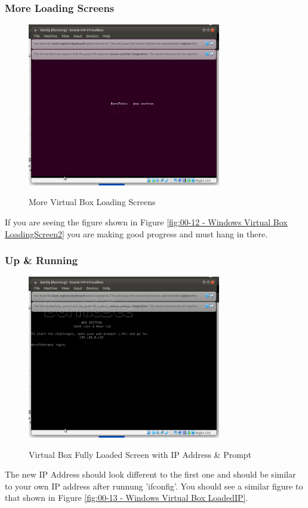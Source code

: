\subsubsection{More Loading Screens}
\begin{figure}[!htb]
    \centering
    \includegraphics[width=0.752\textwidth]{images/00-12.png}\\[0cm]  
    \caption[Windows Virtual Box]{More Virtual Box Loading Screens}
    \label{fig:00-12 - Windows Virtual Box LoadingScreen2} 
\end{figure}
If you are seeing the figure shown in Figure \vref{fig:00-12 - Windows Virtual Box LoadingScreen2}
you are making good progress and must hang in there.

\subsubsection{Up \& Running}

\begin{figure}[!htb]
    \centering
    \includegraphics[width=0.752\textwidth]{images/00-13.png}\\[0cm]  
    \caption[Windows Virtual Box]{Virtual Box Fully Loaded Screen with IP Address \& Prompt}
    \label{fig:00-13 - Windows Virtual Box LoadedIP} 

\end{figure}
The new IP Address should look different to the first one and should be similar to
your own IP address after runnung 'ifconfig'.
You should see a similar figure to that shown in Figure \vref{fig:00-13 - Windows Virtual Box LoadedIP}.

